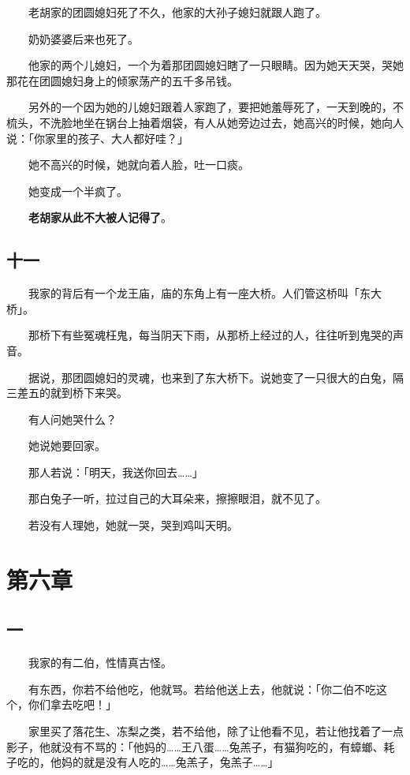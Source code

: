 \documentclass[UTF8]{ctexart}
\begin{document}
　　老胡家的团圆媳妇死了不久，他家的大孙子媳妇就跟人跑了。

　　奶奶婆婆后来也死了。

　　他家的两个儿媳妇，一个为着那团圆媳妇瞎了一只眼睛。因为她天天哭，哭她那花在团圆媳妇身上的倾家荡产的五千多吊钱。

　　另外的一个因为她的儿媳妇跟着人家跑了，要把她羞辱死了，一天到晚的，不梳头，不洗脸地坐在锅台上抽着烟袋，有人从她旁边过去，她高兴的时候，她向人说：「你家里的孩子、大人都好哇？」

　　她不高兴的时候，她就向着人脸，吐一口痰。

　　她变成一个半疯了。

　　\textbf{老胡家从此不大被人记得了}。

\subsection{十一}

　　我家的背后有一个龙王庙，庙的东角上有一座大桥。人们管这桥叫「东大桥」。

　　那桥下有些冤魂枉鬼，每当阴天下雨，从那桥上经过的人，往往听到鬼哭的声音。

　　据说，那团圆媳妇的灵魂，也来到了东大桥下。说她变了一只很大的白兔，隔三差五的就到桥下来哭。

　　有人问她哭什么？

　　她说她要回家。

　　那人若说：「明天，我送你回去……」

　　那白兔子一听，拉过自己的大耳朵来，擦擦眼泪，就不见了。

　　若没有人理她，她就一哭，哭到鸡叫天明。

\section{第六章}

\subsection{一}

　　我家的有二伯，性情真古怪。

　　有东西，你若不给他吃，他就骂。若给他送上去，他就说：「你二伯不吃这个，你们拿去吃吧！」

　　家里买了落花生、冻梨之类，若不给他，除了让他看不见，若让他找着了一点影子，他就没有不骂的：「他妈的……王八蛋……兔羔子，有猫狗吃的，有蟑螂、耗子吃的，他妈的就是没有人吃的……兔羔子，兔羔子……」
\end{document}
